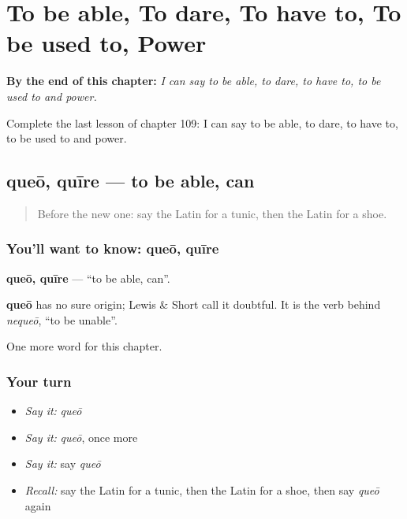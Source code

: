 
\chapter{To be able, To dare, To have to, To be used to, Power}
\label{ch:la-to-be-able-to-dare-to-have-to-to-be-used-to-power}

\begin{chapteropening}
\textbf{By the end of this chapter:} \emph{I can say to be able, to dare, to have to, to be used to and power.}

Complete the last lesson of chapter 109: I can say to be able, to dare, to have to, to be used to and power.
\end{chapteropening}

\section[queō, quīre]{queō, quīre — to be able, can}

\label{lesson:LA-C109-queo}



\begin{quote}
Before the new one: say the Latin for a tunic, then the Latin for a shoe.
\end{quote}

\subsection*{You'll want to know: queō, quīre}
\textbf{queō, quīre} — \textquotedblleft{}to be able, can\textquotedblright{}.

\begin{cousinweb}
\textbf{queō} has no sure origin; Lewis \& Short call it doubtful. It is the verb behind \emph{nequeō}, \textquotedblleft{}to be unable\textquotedblright{}.
\end{cousinweb}

\begin{grammarlens}[title={What you've built}]
One more word for this chapter.
\end{grammarlens}

\subsection*{Your turn}
\begin{itemize}
\raggedright
  \item \emph{Say it:} \emph{queō}
  \item \emph{Say it:} \emph{queō}, once more
  \item \emph{Say it:} say \emph{queō}
  \item \emph{Recall:} say the Latin for a tunic, then the Latin for a shoe, then say \emph{queō} again
\end{itemize}

